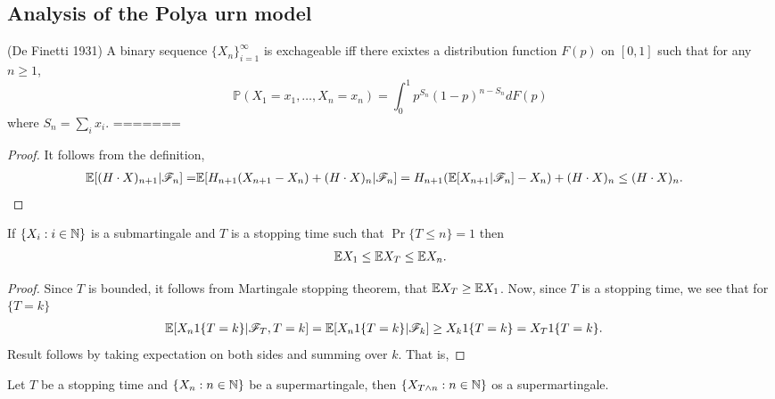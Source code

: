 \documentclass[a4paper,10pt,english]{article}
\begin{document}
\subsection{Analysis of the Polya urn model}
\begin{thm}(De Finetti 1931)
A binary sequence $\{X_n\}_{i=1}^{\infty}$ is exchageable iff there exixtes a distribution function $F(p)$ on $[0,1]$ such that for any $n\geq1$,
\begin{equation*}
\mathbb{P}(X_1=x_1,\dots,X_n=x_n)=\int_0^1 p^{S_n}(1-p)^{n-S_n}dF(p)
\end{equation*}
where $S_n=\sum_i x_i$.
=======
\begin{proof}
It follows from the definition, 
\begin{align*}
\mathbb{E}[(H\cdot X)_{n+1}|\mathscr{F}_n]=&\mathbb{E}[H_{n+1}(X_{n+1}-X_n)+(H\cdot X)_n|\mathscr{F}_n] = H_{n+1}(\mathbb{E}[X_{n+1}|\mathscr{F}_n]-X_n)+(H\cdot X)_n \leq (H\cdot X)_n.
\end{align*}
\end{proof}

\begin{lem}
\label{StoppingTimeBound}
If $\{X_i:  i \in \mathbb{N} \}$ is  a submartingale and $T$ is a stopping time such that $\Pr\{T \leq n\}=1$ then
\begin{align*}
 \mathbb{E} X_1 \leq \mathbb{E} X_T \leq \mathbb{E} X_n.
\end{align*}
\end{lem}
\begin{proof}
Since $T$ is bounded, it follows from Martingale stopping theorem, that $\mathbb{E} X_T  \geq \mathbb{E} X_1$. 
Now, since $T$ is a stopping time, we see that for $\{T = k\}$
\begin{align*}
\E[X_n1\{T = k\}|\F_T,T=k]&= %
\E[X_n1\{T = k\}|\F_k] \geq X_k1\{T = k \} = X_T1\{T = k\}.
\end{align*}
Result follows by taking expectation on both sides and summing over $k$. 
That is,
\end{proof}

\begin{cor}  
Let $T$ be a stopping time and $\{X_n : n \in \mathbb{N}\}$ be a supermartingale, 
then $\{X_{T\wedge n}: n \in \mathbb{N}\}$ os a supermartingale. 
\end{cor}

\end{thm}
\end{document}
